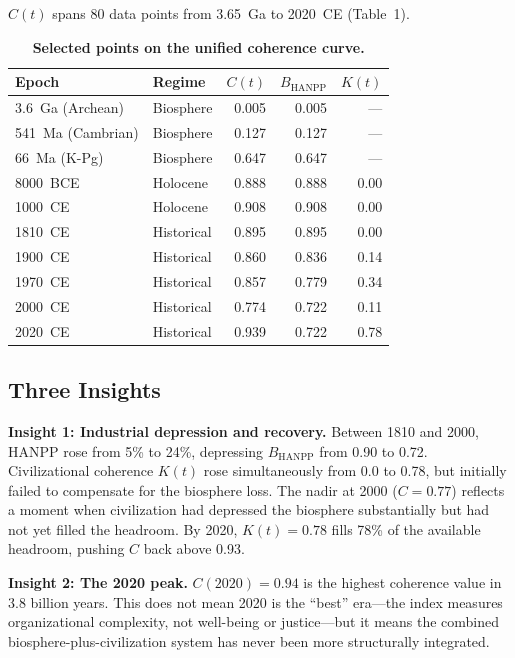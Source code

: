 \documentclass[10pt,letterpaper]{article}
\newcommand{\ct}{$C(t)$}
\begin{document}
\ct{} spans 80 data points from 3.65~Ga to 2020~CE (Table~1).

\begin{table}[H]
\caption{{\bf Selected points on the unified coherence curve.}}
\begin{tabular}{llrrr}
\toprule
Epoch & Regime & $C(t)$ & $B_{\text{HANPP}}$ & $K(t)$ \\
\midrule
3.6~Ga (Archean) & Biosphere & 0.005 & 0.005 & --- \\
541~Ma (Cambrian) & Biosphere & 0.127 & 0.127 & --- \\
66~Ma (K-Pg) & Biosphere & 0.647 & 0.647 & --- \\
8000~BCE & Holocene & 0.888 & 0.888 & 0.00 \\
1000~CE & Holocene & 0.908 & 0.908 & 0.00 \\
1810~CE & Historical & 0.895 & 0.895 & 0.00 \\
1900~CE & Historical & 0.860 & 0.836 & 0.14 \\
1970~CE & Historical & 0.857 & 0.779 & 0.34 \\
2000~CE & Historical & 0.774 & 0.722 & 0.11 \\
2020~CE & Historical & 0.939 & 0.722 & 0.78 \\
\bottomrule
\end{tabular}
\end{table}

\subsection*{Three Insights}

\textbf{Insight 1: Industrial depression and recovery.} Between 1810
and 2000, HANPP rose from 5\% to 24\%, depressing $B_{\text{HANPP}}$
from 0.90 to 0.72. Civilizational coherence $K(t)$ rose simultaneously
from 0.0 to 0.78, but initially failed to compensate for the biosphere
loss. The nadir at 2000 ($C = 0.77$) reflects a moment when civilization
had depressed the biosphere substantially but had not yet filled the
headroom. By 2020, $K(t) = 0.78$ fills 78\% of the available headroom,
pushing $C$ back above 0.93.

\textbf{Insight 2: The 2020 peak.} $C(2020) = 0.94$ is the highest
coherence value in 3.8 billion years. This does not mean 2020 is the
``best'' era---the index measures organizational complexity, not
well-being or justice---but it means the combined biosphere-plus-civilization
system has never been more structurally integrated.
\end{document}
